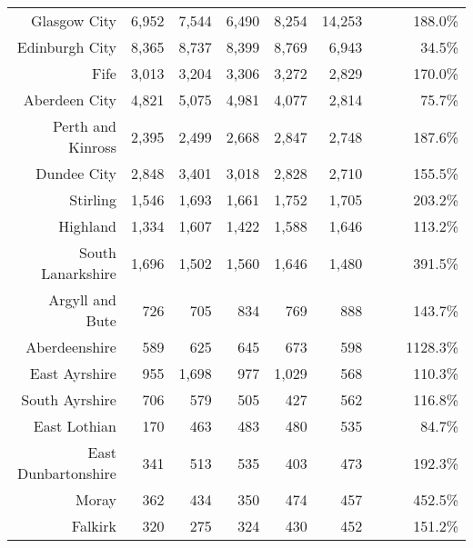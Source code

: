 \documentclass[
  12pt,
]{article}
\begin{document}
\begin{longtable}[t]{rrrrrrrrr}
\endfoot
\bottomrule
\endlastfoot
Glasgow City & 6,952 & 7,544 & 6,490 & 8,254 & 14,253 & \cellcolor{white}{ 72.7\%} & \cellcolor{white}{ 19.7\%} & 188.0\%\\
Edinburgh City & 8,365 & 8,737 & 8,399 & 8,769 & 6,943 & \cellcolor{white}{-20.8\%} & \cellcolor{white}{ -4.6\%} & 34.5\%\\
Fife & 3,013 & 3,204 & 3,306 & 3,272 & 2,829 & \cellcolor{white}{-13.5\%} & \cellcolor{white}{ -1.6\%} & 170.0\%\\
Aberdeen City & 4,821 & 5,075 & 4,981 & 4,077 & 2,814 & \cellcolor{white}{-31.0\%} & \cellcolor{white}{-12.6\%} & 75.7\%\\
Perth and Kinross & 2,395 & 2,499 & 2,668 & 2,847 & 2,748 & \cellcolor{white}{ -3.5\%} & \cellcolor{white}{  3.5\%} & 187.6\%\\
Dundee City & 2,848 & 3,401 & 3,018 & 2,828 & 2,710 & \cellcolor{white}{ -4.2\%} & \cellcolor{white}{ -1.2\%} & 155.5\%\\
Stirling & 1,546 & 1,693 & 1,661 & 1,752 & 1,705 & \cellcolor{white}{ -2.7\%} & \cellcolor{white}{  2.5\%} & 203.2\%\\
Highland & 1,334 & 1,607 & 1,422 & 1,588 & 1,646 & \cellcolor{white}{  3.7\%} & \cellcolor{white}{  5.4\%} & 113.2\%\\
South Lanarkshire & 1,696 & 1,502 & 1,560 & 1,646 & 1,480 & \cellcolor{white}{-10.1\%} & \cellcolor{white}{ -3.3\%} & 391.5\%\\
Argyll and Bute & 726 & 705 & 834 & 769 & 888 & \cellcolor{white}{ 15.5\%} & \cellcolor{white}{  5.2\%} & 143.7\%\\
Aberdeenshire & 589 & 625 & 645 & 673 & 598 & \cellcolor{white}{-11.1\%} & \cellcolor{white}{  0.4\%} & 1128.3\%\\
East Ayrshire & 955 & 1,698 & 977 & 1,029 & 568 & \cellcolor{white}{-44.8\%} & \cellcolor{white}{-12.2\%} & 110.3\%\\
South Ayrshire & 706 & 579 & 505 & 427 & 562 & \cellcolor{white}{ 31.6\%} & \cellcolor{white}{ -5.5\%} & 116.8\%\\
East Lothian & 170 & 463 & 483 & 480 & 535 & \cellcolor{white}{ 11.5\%} & \cellcolor{white}{ 33.2\%} & 84.7\%\\
East Dunbartonshire & 341 & 513 & 535 & 403 & 473 & \cellcolor{white}{ 17.4\%} & \cellcolor{white}{  8.5\%} & 192.3\%\\
Moray & 362 & 434 & 350 & 474 & 457 & \cellcolor{white}{ -3.6\%} & \cellcolor{white}{  6.0\%} & 452.5\%\\
Falkirk & 320 & 275 & 324 & 430 & 452 & \cellcolor{white}{  5.1\%} & \cellcolor{white}{  9.0\%} & 151.2\%\\

\end{longtable}
\end{document}
